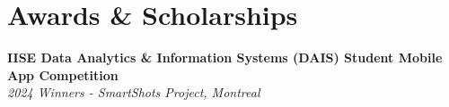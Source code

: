 \documentclass[10pt, letterpaper]{article}
\begin{document}









        \section*{\small Awards \& Scholarships}

        \noindent \textbf{IISE Data Analytics \& Information Systems (DAIS) Student Mobile App Competition} \\
        \textit{2024 Winners - SmartShots Project, Montreal} \\
        
        
        \vspace{0.1em} %
        
        
\end{document}
